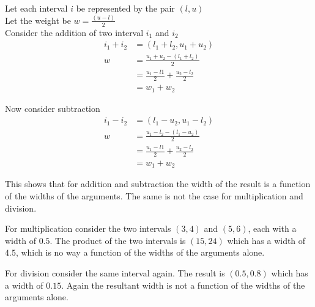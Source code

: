 \documentclass[a4paper,12pt]{article}
\begin{document}
Let each interval $i$ be represented by the pair $(l, u)$ \\

Let the weight be $w = \frac{(u-l)}{2}$ \\

Consider the addition of two interval $i_1$ and $i_2$
\begin{align}
i_1+i_2 &= (l_1+l_2, u_1+u_2) \\
w & = \frac{u_1 + u_2 - (l_1 + l_2)}{2} \\ 
  & = \frac{u_1 - l1}{2} + \frac{u_2 - l_2}{2} \\
  & = w_1 + w_2
\end{align}

Now consider subtraction
\begin{align}
i_1-i_2 &= (l_1-u_2, u_1-l_2) \\
w & = \frac{u_1 - l_2 - (l_1 - u_2)}{2} \\ 
  & = \frac{u_1 - l1}{2} + \frac{u_2 - l_2}{2} \\
  & = w_1 + w_2
\end{align}

This shows that for addition and subtraction the width of the result is a function of the widths of the arguments. The same is not the case for multiplication and division. 

For multiplication consider the two intervals $(3, 4)$ and $(5, 6)$, each with a width of $0.5$. The product of the two intervals is $(15, 24)$ which has a width of $4.5$, which is no way a function of the widths of the arguments alone.

For division consider the same interval again. The result is $(0.5, 0.8)$ which has a width of $0.15$. Again the resultant width is not a function of the widths of the arguments alone.
\end{document}
